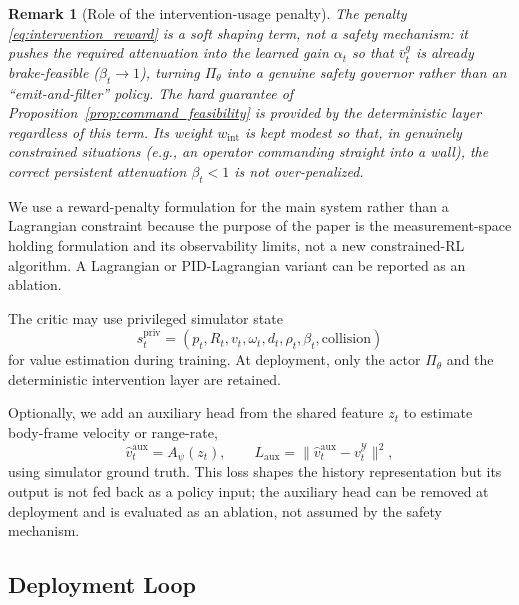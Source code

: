 \documentclass[11pt]{article}
\newtheorem{remark}{Remark}
\begin{document}
\begin{remark}[Role of the intervention-usage penalty]
The penalty \eqref{eq:intervention_reward} is a soft shaping term, not a safety
mechanism: it pushes the required attenuation into the learned gain $\alpha_t$ so
that $\bar v^g_t$ is already brake-feasible ($\beta_t\to1$), turning
$\Pi_\theta$ into a genuine safety governor rather than an ``emit-and-filter''
policy. The hard guarantee of
Proposition~\ref{prop:command_feasibility} is provided by the deterministic layer
regardless of this term. Its weight $w_{\mathrm{int}}$ is kept modest so that, in
genuinely constrained situations (e.g., an operator commanding straight into a
wall), the correct persistent attenuation $\beta_t<1$ is not over-penalized.
\end{remark}

We use a reward-penalty formulation for the main system rather than a Lagrangian
constraint because the purpose of the paper is the measurement-space holding
formulation and its observability limits, not a new constrained-RL algorithm. A
Lagrangian or PID-Lagrangian variant can be reported as an ablation.

The critic may use privileged simulator state
\begin{equation}
    s^{\mathrm{priv}}_t = (p_t,R_t,v_t,\omega_t,d_t,\rho_t,\beta_t,
    \mathrm{collision})
    \label{eq:privileged_state}
\end{equation}
for value estimation during training. At deployment, only the actor
$\Pi_\theta$ and the deterministic intervention layer are retained.

Optionally, we add an auxiliary head from the shared feature $z_t$ to estimate
body-frame velocity or range-rate,
\begin{equation}
    \hat v^{\mathrm{aux}}_t = A_\psi(z_t),
    \qquad
    L_{\mathrm{aux}} = \|\hat v^{\mathrm{aux}}_t - v^{\mathcal{Y}}_t\|^2,
    \label{eq:auxiliary_loss}
\end{equation}
using simulator ground truth. This loss shapes the history representation but
its output is not fed back as a policy input; the auxiliary head can be removed
at deployment and is evaluated as an ablation, not assumed by the safety
mechanism.

\subsection{Deployment Loop}
\label{sec:deployment_loop}
\end{document}
